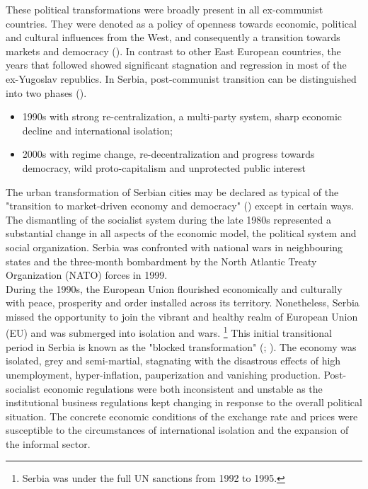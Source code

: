 \documentclass[11pt]{report}
\begin{document}
These political transformations were broadly present in all ex-communist countries. They were denoted as a policy of openness towards economic, political and cultural influences from the West, and consequently a transition towards markets and democracy (\href{Vujosevic}{\citealt{vujosevic_conundrum_2012}}). In contrast to other East European countries, the years that followed showed significant stagnation and regression in most of the ex-Yugoslav republics. In Serbia, post-communist transition can be distinguished into two phases (\href{Nedovic}{\citealt{nedovic-budic_mornings_2011}}).

\begin{itemize}
\item 1990s with strong re-centralization, a multi-party system, sharp economic decline and international isolation;
\item 2000s with regime change, re-decentralization and progress towards democracy, wild proto-capitalism and unprotected public interest
\end{itemize}       
     
The urban transformation of Serbian cities may be declared as typical of the "transition to market-driven economy and democracy" (\href{Tsenkova}{\citealt{tsenkova_beyond_2006}}) except in certain ways. The dismantling of the socialist system during the late 1980s represented a substantial change in all aspects of the economic model, the political system and social organization. Serbia was confronted with national wars in  neighbouring states and the three-month bombardment by the North Atlantic Treaty Organization (NATO) forces in 1999.
\\

During the 1990s, the European Union flourished economically and culturally with peace, prosperity and order installed across its territory. Nonetheless, Serbia missed the opportunity to join the vibrant and healthy realm of European Union (EU) and was submerged into isolation and wars. 
\footnote{Serbia was under the full UN sanctions from 1992 to 1995.} 
This initial transitional period in Serbia is known as the "blocked transformation" (\href{Lazic}{\citealt{lazic_nation_2009}}; \href{Vujosevic}{\citealt{vujosevic_conundrum_2012}}).
The economy was isolated, grey and semi-martial, stagnating with the disastrous effects of high unemployment, hyper-inflation, pauperization and vanishing production.  Post-socialist economic regulations were both inconsistent and unstable as the institutional business regulations kept changing in response to the overall political situation. The concrete economic conditions of the exchange rate and prices were susceptible to the circumstances of international isolation and the expansion of the informal sector.
\\
\end{document}
